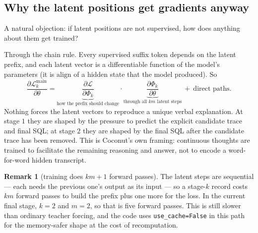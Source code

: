 \documentclass[11pt]{article}
\theoremstyle{definition}
\newtheorem{remark}[theorem]{Remark}
\begin{document}
\begin{center}
\end{center}

\subsection{Why the latent positions get gradients anyway}

A natural objection: if latent positions are not supervised, how does anything about them get trained?

Through the chain rule. Every supervised suffix token depends on the latent prefix, and each latent vector is a differentiable function of the model's parameters (it is $\mathrm{align}$ of a hidden state that the model produced). So
\[
\frac{\partial \mathcal{L}^{\mathrm{main}}_k}{\partial\theta}
= \underbrace{\frac{\partial\mathcal{L}}{\partial\Phi_k}}_{\text{how the prefix should change}}
\cdot
\underbrace{\frac{\partial\Phi_k}{\partial\theta}}_{\text{through all $km$ latent steps}}
\ +\ \text{direct paths}.
\]
Nothing forces the latent vectors to reproduce a unique verbal explanation. At stage $1$ they are shaped by the pressure to predict the explicit candidate trace and final SQL; at stage $2$ they are shaped by the final SQL after the candidate trace has been removed. This is Coconut's own framing: continuous thoughts are trained to facilitate the remaining reasoning and answer, not to encode a word-for-word hidden transcript.

\begin{remark}[training does $km+1$ forward passes]
The latent steps are sequential --- each needs the previous one's output as its input --- so a stage-$k$ record costs $km$ forward passes to build the prefix plus one more for the loss. In the current final stage, $k=2$ and $m=2$, so that is five forward passes. This is still slower than ordinary teacher forcing, and the code uses \texttt{use\_cache=False} in this path for the memory-safer shape at the cost of recomputation.
\end{remark}
\end{document}
